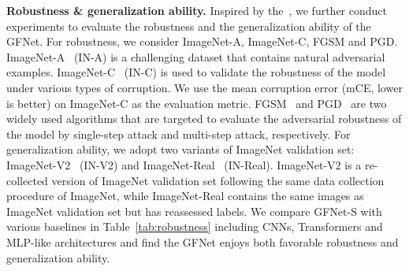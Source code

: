 \documentclass{article}
\numberwithin{equation}{section}
\newcommand{\paragrapha}[2][1pt]{\vspace{#1}\noindent\textbf{#2}}
\begin{document}
\paragrapha{Robustness \& generalization ability.} Inspired by the~\cite{mao2021rethinking}, we further conduct experiments to evaluate the robustness and the generalization ability of the GFNet. For robustness, we consider ImageNet-A, ImageNet-C, FGSM and PGD. ImageNet-A~\cite{hendrycks2021natural_imageneta} (IN-A) is a challenging dataset that contains natural adversarial examples. ImageNet-C~\cite{hendrycks2019benchmarking_imagenetc} (IN-C) is used to validate the robustness of the model under various types of corruption. We use the mean corruption error (mCE, lower is better) on ImageNet-C as the evaluation metric. FGSM~\cite{goodfellow2014explaining_fgsm} and PGD~\cite{madry2017towards_pgd} are two widely used algorithms that are targeted to evaluate the adversarial robustness of the model by single-step attack and multi-step attack, respectively. For generalization ability, we adopt two variants of ImageNet validation set: ImageNet-V2~\cite{recht2019imagenet_v2} (IN-V2) and ImageNet-Real~\cite{beyer2020imagenet_real} (IN-Real). ImageNet-V2 is a re-collected version of ImageNet validation set following the same data collection procedure of ImageNet, while ImageNet-Real contains the same images as ImageNet validation set but has reassessed labels. We compare GFNet-S with various baselines in Table~\ref{tab:robustness} including CNNs, Transformers and MLP-like architectures and find the GFNet enjoys both favorable robustness and generalization ability.
\end{document}
